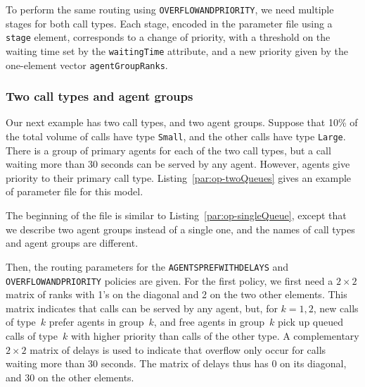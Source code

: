 To perform the same routing using
\texttt{OVERFLOWANDPRIORITY},
we need multiple stages for both call types.
Each stage, encoded in the parameter file using a
\texttt{stage} element, corresponds to a change of priority, with a threshold on
the waiting time set by the \texttt{waiting\-Time} attribute, and
a new priority given by the one-element vector
\texttt{agent\-Group\-Ranks}.

\subsubsection{Two call types and agent groups}

Our next example has two call types, and two agent groups.
Suppose that 10\% of the total volume of calls have type \texttt{Small}, and
the other calls have type \texttt{Large}.
There is a group of primary agents for each of the two call types, but
a call waiting more than 30 seconds can be served by any agent.
However, agents give priority to their primary call type.
Listing~\ref{par:op-twoQueues} gives an example of parameter file for
this model.



The beginning of the file is similar to
Listing~\ref{par:op-singleQueue}, except that we describe two agent
groups instead of a single one, and the names of call types and agent
groups are different.

Then, the routing parameters for the \texttt{AGENTSPREFWITHDELAYS}
and \texttt{OVERFLOWANDPRIORITY} policies are given.
For the first policy,
we first need a $2\times 2$ matrix of ranks with 1's on the diagonal
and 2 on the two other elements. This matrix indicates that
calls can
be served by any agent, but, for $k=1,2$, new calls of type~$k$ prefer agents
in group~$k$, and free agents in group~$k$ pick up queued calls of
type~$k$ with higher priority than calls of the other type.
A complementary $2\times 2$ matrix of delays is used to indicate that overflow
only occur for calls waiting more than 30 seconds.
The matrix of delays thus has 0 on its diagonal, and 30 on the other
elements.

